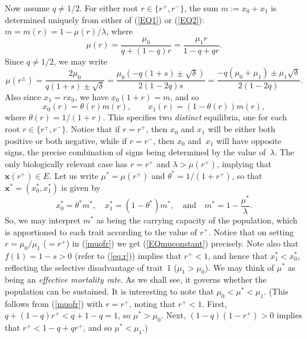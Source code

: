 \documentclass[12pt]{article}
\newcommand{\bx}{\boldsymbol{x}}
\begin{document}
Now assume $q\neq 1/2$.
For either root $r\in \{r^+,r^-\}$, the sum $m:=x_0+x_1$
is determined uniquely from either of (\ref{EQ1}) or (\ref{EQ2}):
$m=m(r)=1-\mu(r)/\lambda$, where
\begin{equation}
\mu(r) =\frac{\mu_0}{q+(1-q)r} =\frac{\mu_1 r}{1-q+qr}.
\label{muofr}
\end{equation}
Since $q\neq 1/2$, we may write
\begin{equation}
\mu(r^{\pm})
=\frac{2\mu_0}{q(1+s) \pm \sqrt{\delta}}
=\frac{\mu_0(-q(1+s) \pm \sqrt{\delta})}{2(1-2q)s}
=\frac{-q(\mu_0+\mu_1) \pm \mu_1\sqrt{\delta}}{2(1-2q)}.
\label{mustar}
\end{equation}
Also since $x_1=r x_0$, we have $x_0(1+r)=m$, and so 
$$
x_0(r) = \theta(r) m(r),
\qquad
x_1(r) = (1-\theta(r)) m(r),
$$
where $\theta(r)=1/(1+r)$.
This specifies two {\em distinct\/} equilibria, one for each root
$r\in \{r^+,r^-\}$. Notice that if $r=r^+$, then
$x_0$ and $x_1$ will be either both positive or both negative, 
while if $r=r^-$, then $x_0$ and~$x_1$ will have opposite signs,
the precise combination of signs being determined by the value of~$\lambda$. 
The only biologically relevant case has $r=r^+$
and $\lambda > \mu(r^+)$, implying that $\bx(r^+)\in E$. Let
us write $\mu^*=\mu(r^+)$ and $\theta^*=1/(1+r^+)$,
so that $\bx^*=(x_0^*,x_1^*)$ is given by
$$
x_0^* = \theta^* m^*, \quad x_1^* = (1-\theta^*) m^*,
\quad \text{and} \quad
m^*=1-\frac{\mu^*}{\lambda}.
$$
So, we may interpret $m^*$ as being the carrying capacity of the population,
which is apportioned to each trait according to the value of $r^+$.
Notice that on setting
$r=\mu_0/\mu_1$ ($=r^+$) in (\ref{muofr}) we get (\ref{EQmuconstant})
precisely. 
Note also that $f(1)=1-s>0$ (refer to (\ref{eq:r})) implies that
$r^+<1$, and hence that $x_1^*<x_0^*$,
reflecting the selective disadvantage of trait~1 ($\mu_1>\mu_0$).
We may think of $\mu^*$ as being an {\em effective mortality rate\/}. As we
shall see, it governs whether the population can be sustained.
It is interesting to note that $\mu_0<\mu^*<\mu_1$.
(This follows from (\ref{muofr}) with $r=r^+$, 
noting that $r^+<1$. First, $q+(1-q)r^+<q+1-q=1$, so $\mu^*>\mu_0$.
Next, $(1-q)(1-r^+)>0$ implies that $r^+<1-q+qr^+$, and so
$\mu^*<\mu_1$.)
\end{document}

